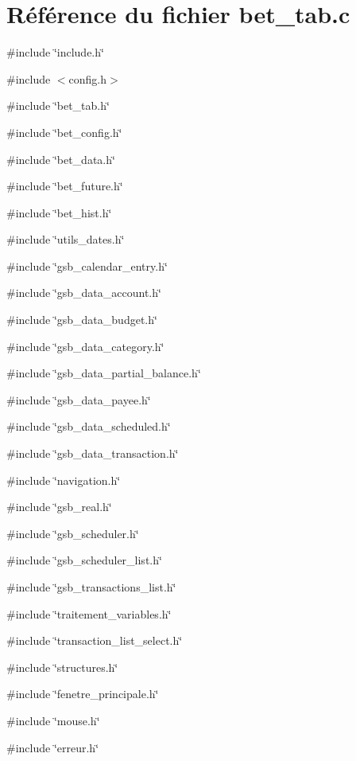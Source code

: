 \section{Référence du fichier bet\_\-tab.c}
\label{bet__tab_8c}
{\ttfamily \#include \char`\"{}include.h\char`\"{}}\par
{\ttfamily \#include $<$config.h$>$}\par
{\ttfamily \#include \char`\"{}bet\_\-tab.h\char`\"{}}\par
{\ttfamily \#include \char`\"{}bet\_\-config.h\char`\"{}}\par
{\ttfamily \#include \char`\"{}bet\_\-data.h\char`\"{}}\par
{\ttfamily \#include \char`\"{}bet\_\-future.h\char`\"{}}\par
{\ttfamily \#include \char`\"{}bet\_\-hist.h\char`\"{}}\par
{\ttfamily \#include \char`\"{}utils\_\-dates.h\char`\"{}}\par
{\ttfamily \#include \char`\"{}gsb\_\-calendar\_\-entry.h\char`\"{}}\par
{\ttfamily \#include \char`\"{}gsb\_\-data\_\-account.h\char`\"{}}\par
{\ttfamily \#include \char`\"{}gsb\_\-data\_\-budget.h\char`\"{}}\par
{\ttfamily \#include \char`\"{}gsb\_\-data\_\-category.h\char`\"{}}\par
{\ttfamily \#include \char`\"{}gsb\_\-data\_\-partial\_\-balance.h\char`\"{}}\par
{\ttfamily \#include \char`\"{}gsb\_\-data\_\-payee.h\char`\"{}}\par
{\ttfamily \#include \char`\"{}gsb\_\-data\_\-scheduled.h\char`\"{}}\par
{\ttfamily \#include \char`\"{}gsb\_\-data\_\-transaction.h\char`\"{}}\par
{\ttfamily \#include \char`\"{}navigation.h\char`\"{}}\par
{\ttfamily \#include \char`\"{}gsb\_\-real.h\char`\"{}}\par
{\ttfamily \#include \char`\"{}gsb\_\-scheduler.h\char`\"{}}\par
{\ttfamily \#include \char`\"{}gsb\_\-scheduler\_\-list.h\char`\"{}}\par
{\ttfamily \#include \char`\"{}gsb\_\-transactions\_\-list.h\char`\"{}}\par
{\ttfamily \#include \char`\"{}traitement\_\-variables.h\char`\"{}}\par
{\ttfamily \#include \char`\"{}transaction\_\-list\_\-select.h\char`\"{}}\par
{\ttfamily \#include \char`\"{}structures.h\char`\"{}}\par
{\ttfamily \#include \char`\"{}fenetre\_\-principale.h\char`\"{}}\par
{\ttfamily \#include \char`\"{}mouse.h\char`\"{}}\par
{\ttfamily \#include \char`\"{}erreur.h\char`\"{}}\par
